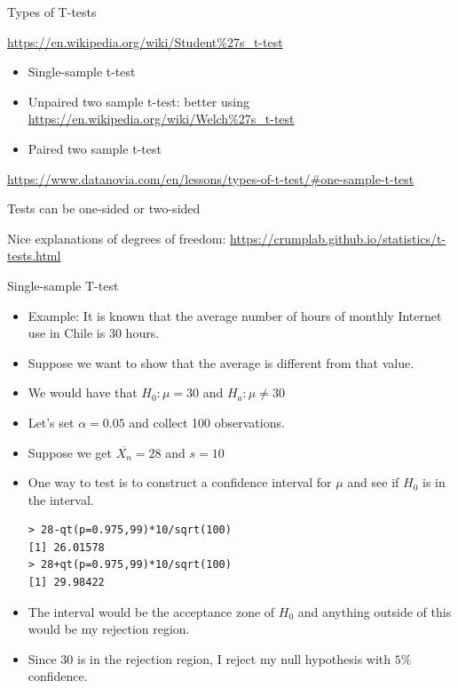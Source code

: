 \documentclass[handout]{beamer}
\begin{document}
\begin{frame}{Types of T-tests}
 \scriptsize{
\url{https://en.wikipedia.org/wiki/Student\%27s_t-test}
\begin{itemize}
 \item Single-sample t-test
 \item Unpaired two sample t-test: better using \url{https://en.wikipedia.org/wiki/Welch\%27s_t-test}
 \item Paired two sample t-test
\end{itemize}

\url{https://www.datanovia.com/en/lessons/types-of-t-test/\#one-sample-t-test}
}
Tests can be one-sided or two-sided

Nice explanations of degrees of freedom: \url{https://crumplab.github.io/statistics/t-tests.html}

\end{frame}



\begin{frame}[fragile]{Single-sample T-test}
\scriptsize{
\begin{itemize}
 \item Example: It is known that the average number of hours of monthly Internet use in Chile is 30 hours.
 \item Suppose we want to show that the average is different from that value.
 \item We would have that $H_0: \mu=30$ and $H_{a}: \mu \neq 30$
 \item Let's set $\alpha=0.05$ and collect 100 observations.
 \item Suppose we get $\overline{X_{n}}=28$ and $s=10$
 \item  One way to test is to construct a confidence interval for $\mu$ and see if $H_{0}$ is in the interval.
\begin{verbatim}
> 28-qt(p=0.975,99)*10/sqrt(100)
[1] 26.01578
> 28+qt(p=0.975,99)*10/sqrt(100)
[1] 29.98422 
\end{verbatim}
\item The interval would be the acceptance zone of $H_0$ and anything outside of this would be my rejection region.
\item Since 30 is in the rejection region, I reject my null hypothesis with $5\%$ confidence.
\end{itemize}



} 
\end{frame}
\end{document}

